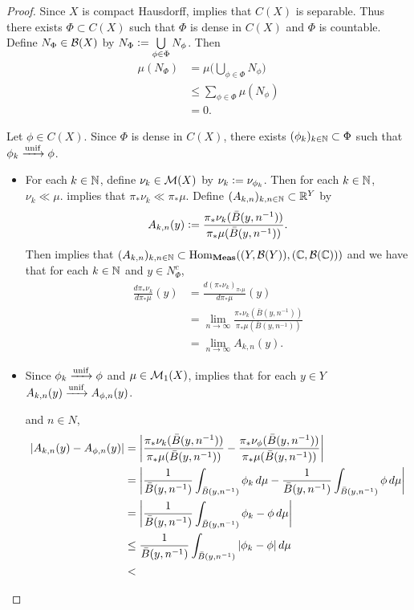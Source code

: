 \documentclass{book}
\begin{document}
\begin{proof}
	\item Since $X$ is compact Hausdorff, \rex{}  implies that $C(X)$ is separable. Thus there exists $\Phi \subset C(X)$ such that $\Phi$ is dense in $C(X)$ and $\Phi$ is countable. Define $N_{\Phi} \in \mathcal{B}(X)$ by $N_{\Phi} \vcentcolon= \bigcup\limits_{\phi \in \Phi}N_{\phi}$. Then 
	\begin{align*}
		\mu(N_{\Phi}) 
		& = \mu \bigg( \bigcup\limits_{\phi \in \Phi}N_{\phi} \bigg) \\
		& \leq \sum\limits_{\phi \in \Phi} \mu(N_{\phi}) \\
		& = 0.
	\end{align*}
	\item Let $\phi \in C(X)$. Since $\Phi$ is dense in $C(X)$, there exists $(\phi_k)_{k \in \mathbb{N}} \subset \Phi$ such that $\phi_k \xrightarrow{\text{unif}} \phi$. 
	\begin{itemize}
		\item For each $k \in \mathbb{N}$, define $\nu_k \in \mathcal{M}(X)$ by $\nu_k \vcentcolon= \nu_{\phi_k}$. Then for each $k \in \mathbb{N}$, $\nu_k \ll \mu$.  implies that $\pi_*\nu_k \ll \pi_* \mu$. Define $(A_{k, n})_{k,n \in \mathbb{N}} \subset \mathbb{R}^Y$ by 
		$$A_{k,n}(y) \vcentcolon= \frac{\pi_*\nu_k(\bar{B}(y, n^{-1}))}{\pi_*\mu(\bar{B}(y, n^{-1}))}.$$
		Then   implies that $(A_{k, n})_{k,n \in \mathbb{N}} \subset \operatorname{Hom}_{\operatorname{\text{\textbf{Meas}}}}((Y, \mathcal{B}(Y)), (\mathbb{C}, \mathcal{B}(\mathbb{C})))$ and  we have that for each $k \in \mathbb{N}$ and $y \in N_{\Phi}^c$,
		\begin{align*}
			\frac{d\pi_*\nu_k}{d\pi_*\mu}(y)
			& = \frac{d(\pi_*\nu_k)_{\pi_*\mu}}{d\pi_*\mu}(y) \\
			& = \lim_{n \rightarrow \infty} \frac{ \pi_*\nu_k(\bar{B}(y, n^{-1}))}{\pi_*\mu(\bar{B}(y, n^{-1}))} \\
			& = \lim_{n \rightarrow \infty} A_{k,n}(y).
		\end{align*}
		\item Since $\phi_k \xrightarrow{\text{unif}} \phi$ and $\mu \in \mathcal{M}_1(X)$,  implies that for each $y \in Y$ $A_{k,n}(y) \xrightarrow{\text{unif}} A_{\phi,n}(y)$. 
		
		 and $n \in N$,
		\begin{align*}
			|A_{k,n}(y) - A_{\phi,n}(y)|
			& = \bigg| \frac{ \pi_*\nu_k(\bar{B}(y, n^{-1}))}{\pi_*\mu(\bar{B}(y, n^{-1}))} - \frac{ \pi_*\nu_{\phi}(\bar{B}(y, n^{-1}))}{\pi_*\mu(\bar{B}(y, n^{-1}))} \bigg| \\
			& = \bigg| \frac{1}{\bar{B}(y, n^{-1})} \int_{\bar{B}(y, n^{-1})} \phi_k \, d \mu  - \frac{1}{\bar{B}(y, n^{-1})} \int_{\bar{B}(y, n^{-1})} \phi \, d \mu  \bigg| \\
			& = \bigg| \frac{1}{\bar{B}(y, n^{-1})} \int_{\bar{B}(y, n^{-1})} \phi_k - \phi \, d \mu  \bigg| \\
			& \leq \frac{1}{\bar{B}(y, n^{-1})} \int_{\bar{B}(y, n^{-1})} |\phi_k - \phi| \, d \mu \\
			&  < 
		\end{align*}
		

\end{itemize}
\end{proof}
\end{document}
